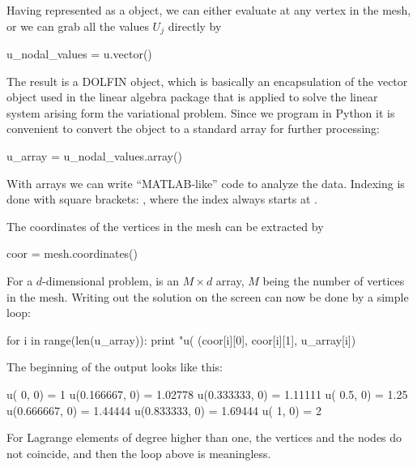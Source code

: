 Having  represented as a  object,
we can either evaluate  at any vertex  in the mesh,
or we can grab all the values
$U_j$ directly by
\begin{python}
u_nodal_values = u.vector()
\end{python}
The result is a DOLFIN  object, which is basically an
encapsulation of the vector object used in the linear algebra package
that is applied to solve the linear system arising form the
variational problem.
Since we program in Python it is convenient to convert the
 object to a standard  array for further
processing:
\begin{python}
u_array = u_nodal_values.array()
\end{python}
With  arrays we can write ``MATLAB-like'' code to analyze
the data. Indexing is done with square brackets: ,
where the index  always starts at .

The coordinates of the vertices in the mesh can be extracted
by
\begin{python}
coor = mesh.coordinates()
\end{python}
For a $d$-dimensional problem,  is an $M\times d$
 array,
$M$ being the number of vertices in the mesh. Writing out the solution
on the screen can now be done by a simple loop:
\begin{python}
for i in range(len(u_array)):
    print "u(%
          (coor[i][0], coor[i][1], u_array[i])
\end{python}
The beginning of the output looks like this:
\begin{progoutput}
u(       0,       0) = 1
u(0.166667,       0) = 1.02778
u(0.333333,       0) = 1.11111
u(     0.5,       0) = 1.25
u(0.666667,       0) = 1.44444
u(0.833333,       0) = 1.69444
u(       1,       0) = 2
\end{progoutput}
\noindent
For Lagrange elements of degree higher than one, the vertices and the
nodes do not coincide, and then the loop above is meaningless.

